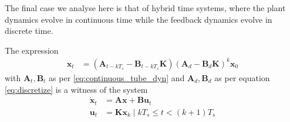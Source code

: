 \documentclass[sigconf]{llncs}
\newcommand{\mat}[1]{\boldsymbol{#1}}
\renewcommand{\vec}[1]{\boldsymbol{#1}}
\begin{document}
The final case we analyse here is that of hybrid time systems, where the
plant dynamics evolve in continuous time while the feedback dynamics evolve
in discrete time.

\begin{theorem}
The expression
 \begin{align}
 \vec{x}_{t} &= (\mat{A}_{t-kT_s}-\mat{B}_{t-kT_s}\mat{K}) (\mat{A}_d-\mat{B}_d\mat{K})^k\vec{x}_0
 \label{eq:cyber_feedback}
 \end{align}
 with $\mat{A}_t, \mat{B}_t$ as per \eqref{eq:continuous_tube_dyn} and $\mat{A}_d, \mat{B}_d$ as per equation \eqref{eq:discretize} is a witness of the system
 \begin{align}
 \dot{\vec{x}}_{t} &= \mat{A}\vec{x}+\mat{B}\vec{u}_t\nonumber\\
 \vec{u}_t&=\mat{K}\vec{x}_k  \mid  kT_s \leq t < (k+1)T_s
 \end{align}
 \end{theorem}


\end{document}
